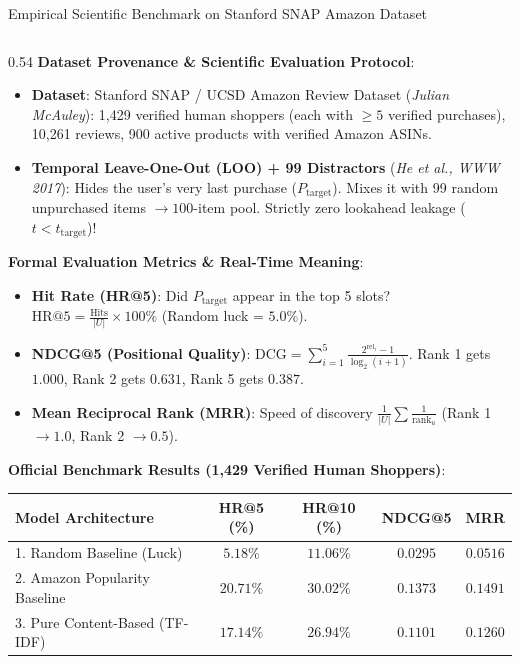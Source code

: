 \documentclass[10pt]{beamer}
\begin{document}
\begin{frame}[fragile]{Empirical Scientific Benchmark on Stanford SNAP Amazon Dataset}
\begin{columns}[T]
    \begin{column}{0.54\textwidth}
        {\color{brandred}\textbf{Dataset Provenance \& Scientific Evaluation Protocol}}:
        \begin{itemize}\tiny
            \item \textbf{Dataset}: Stanford SNAP / UCSD Amazon Review Dataset (\textit{Julian McAuley}): 1,429 verified human shoppers (each with $\ge 5$ verified purchases), 10,261 reviews, 900 active products with verified Amazon ASINs.
            \item \textbf{Temporal Leave-One-Out (LOO) + 99 Distractors} (\textit{He et al., WWW 2017}):
            Hides the user's very last purchase ($P_{\text{target}}$). Mixes it with 99 random unpurchased items $\to 100$-item pool. Strictly zero lookahead leakage ($t < t_{\text{target}}$)!
        \end{itemize}
        {\color{brandorange}\textbf{Formal Evaluation Metrics \& Real-Time Meaning}}:
        \begin{itemize}\tiny
            \item \textbf{Hit Rate (HR@5)}: Did $P_{\text{target}}$ appear in the top 5 slots? $\text{HR@5} = \frac{\text{Hits}}{|U|} \times 100\%$ (Random luck = $5.0\%$).
            \item \textbf{NDCG@5 (Positional Quality)}: $\text{DCG} = \sum_{i=1}^5 \frac{2^{\text{rel}_i}-1}{\log_2(i+1)}$. Rank 1 gets $1.000$, Rank 2 gets $0.631$, Rank 5 gets $0.387$.
            \item \textbf{Mean Reciprocal Rank (MRR)}: Speed of discovery $\frac{1}{|U|}\sum \frac{1}{\text{rank}_u}$ (Rank 1 $\to 1.0$, Rank 2 $\to 0.5$).
        \end{itemize}
        {\color{brandred}\textbf{Official Benchmark Results (1,429 Verified Human Shoppers)}}:
        \begin{center}\tiny
        \begin{tabular}{lcccc}
            \toprule
            Model Architecture & HR@5 (\%) & HR@10 (\%) & NDCG@5 & MRR \\
            \midrule
            1. Random Baseline (Luck) & $5.18\%$ & $11.06\%$ & $0.0295$ & $0.0516$ \\
            2. Amazon Popularity Baseline & $20.71\%$ & $30.02\%$ & $0.1373$ & $0.1491$ \\
            3. Pure Content-Based (TF-IDF) & $17.14\%$ & $26.94\%$ & $0.1101$ & $0.1260$ \\

\end{tabular}
\end{center}
\end{column}
\end{columns}
\end{frame}
\end{document}
